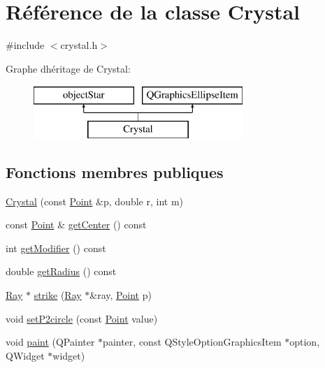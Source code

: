 \hypertarget{class_crystal}{}\section{Référence de la classe Crystal}
\label{class_crystal}


{\ttfamily \#include $<$crystal.\+h$>$}

Graphe d\textquotesingle{}héritage de Crystal\+:\begin{figure}[H]
\begin{center}
\leavevmode
\includegraphics[height=2.000000cm]{class_crystal}
\end{center}
\end{figure}
\subsection*{Fonctions membres publiques}
\begin{DoxyCompactItemize}
\item 
\mbox{\hyperlink{class_crystal_a21597991198db73fdfe051ae1a4fec68}{Crystal}} (const \mbox{\hyperlink{class_point}{Point}} \&p, double r, int m)
\item 
const \mbox{\hyperlink{class_point}{Point}} \& \mbox{\hyperlink{class_crystal_a256caaa33e440e9a0822fd02fa254353}{get\+Center}} () const
\item 
int \mbox{\hyperlink{class_crystal_a31e3be3b9eae48eec045b8227d4a7e63}{get\+Modifier}} () const
\item 
double \mbox{\hyperlink{class_crystal_ac776e15863abb706f8bddbeb9889a400}{get\+Radius}} () const
\item 
\mbox{\hyperlink{class_ray}{Ray}} $\ast$ \mbox{\hyperlink{class_crystal_a9efb5c57c177f0f2b627be88b484fe9f}{strike}} (\mbox{\hyperlink{class_ray}{Ray}} $\ast$\&ray, \mbox{\hyperlink{class_point}{Point}} p)
\item 
void \mbox{\hyperlink{class_crystal_aa14a5622d3e0c4d5f7c58d5e86de5678}{set\+P2circle}} (const \mbox{\hyperlink{class_point}{Point}} value)
\item 
void \mbox{\hyperlink{class_crystal_a229bc883860709556e171ee799cab51d}{paint}} (Q\+Painter $\ast$painter, const Q\+Style\+Option\+Graphics\+Item $\ast$option, Q\+Widget $\ast$widget)
\end{DoxyCompactItemize}
